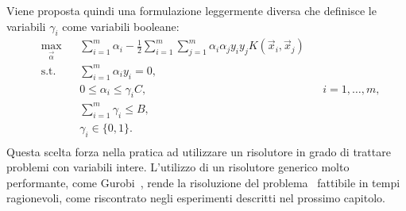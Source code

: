 Viene proposta quindi una formulazione leggermente diversa che definisce le variabili $\gamma_i$ come variabili booleane:
\begin{equation}\label{eq:budget_svc:binary_gamma_formulation}
\begin{aligned}
& \max_{\vec{\alpha}}    && \sum_{i=1}^{m}\alpha_i - \frac{1}{2}\sum_{i=1}^{m}\sum_{j=1}^{m}\alpha_i\alpha_jy_iy_jK(\Vec{x}_i, \Vec{x}_j)\\
& \textrm{s.t.} && \sum_{i=1}^{m} \alpha_iy_i = 0,                   \\
&               && 0 \leq \alpha_i \leq \gamma_iC,   && i=1,\dots,m,  \\
&               && \sum_{i=1}^{m} \gamma_i \leq B,                  \\
&               && \gamma_i \in \{0,1\}.                            \\
\end{aligned}
\end{equation}
Questa scelta forza nella pratica ad utilizzare un risolutore in grado di trattare problemi con variabili intere.
L'utilizzo di un risolutore generico molto performante, come Gurobi~\cite{gurobi}, rende la risoluzione del problema~ fattibile in tempi ragionevoli, come riscontrato negli esperimenti descritti nel prossimo capitolo.
